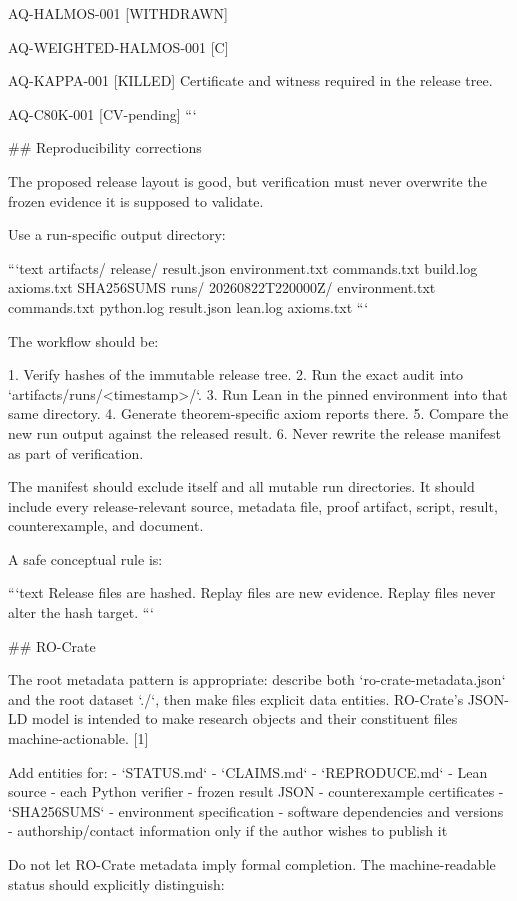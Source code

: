 AQ-HALMOS-001
[WITHDRAWN]

AQ-WEIGHTED-HALMOS-001
[C]

AQ-KAPPA-001
[KILLED]
Certificate and witness required in the release tree.

AQ-C80K-001
[CV-pending]
```

## Reproducibility corrections

The proposed release layout is good, but verification must never overwrite the frozen evidence it is supposed to validate.

Use a run-specific output directory:

```text
artifacts/
  release/
    result.json
    environment.txt
    commands.txt
    build.log
    axioms.txt
    SHA256SUMS
  runs/
    20260822T220000Z/
      environment.txt
      commands.txt
      python.log
      result.json
      lean.log
      axioms.txt
```

The workflow should be:

1. Verify hashes of the immutable release tree.
2. Run the exact audit into `artifacts/runs/<timestamp>/`.
3. Run Lean in the pinned environment into that same directory.
4. Generate theorem-specific axiom reports there.
5. Compare the new run output against the released result.
6. Never rewrite the release manifest as part of verification.

The manifest should exclude itself and all mutable run directories. It should include every release-relevant source, metadata file, proof artifact, script, result, counterexample, and document.

A safe conceptual rule is:

```text
Release files are hashed.
Replay files are new evidence.
Replay files never alter the hash target.
```

## RO-Crate

The root metadata pattern is appropriate: describe both `ro-crate-metadata.json` and the root dataset `./`, then make files explicit data entities. RO-Crate’s JSON-LD model is intended to make research objects and their constituent files machine-actionable. [1]

Add entities for:
- `STATUS.md`
- `CLAIMS.md`
- `REPRODUCE.md`
- Lean source
- each Python verifier
- frozen result JSON
- counterexample certificates
- `SHA256SUMS`
- environment specification
- software dependencies and versions
- authorship/contact information only if the author wishes to publish it

Do not let RO-Crate metadata imply formal completion. The machine-readable status should explicitly distinguish:


